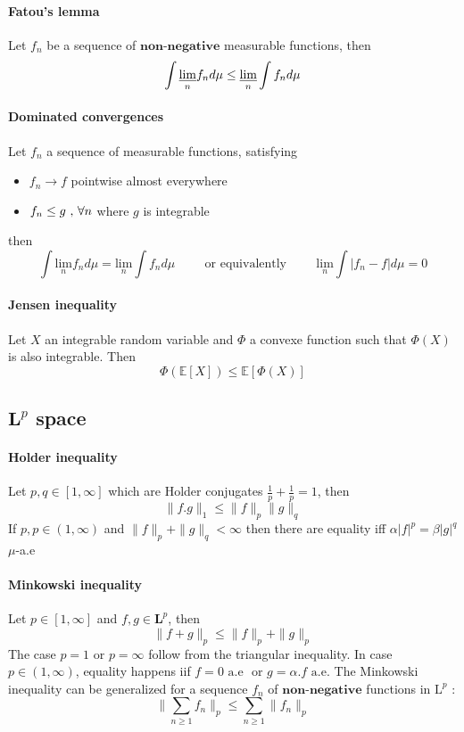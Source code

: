 \documentclass[a4paper,10pt]{article}
\begin{document}
\paragraph{Fatou's lemma}
Let $f_n$ be a sequence of $\textbf{non-negative}$ measurable functions, then
\[
\int \underset{n}{\varliminf} f_n d\mu \leq \underset{n}{\varliminf} \int  f_n d\mu 
\]

\paragraph{Dominated convergences}
Let $f_n$ a sequence of measurable functions, satisfying 
\begin{itemize}
 \item $f_n \longrightarrow f $ pointwise almost everywhere
 \item $f_n \leq g \hbox{ , } \forall n$ where $g$ is integrable 
\end{itemize}
then
\[
\int \underset{n}{\text{lim}} f_n d\mu = \underset{n}{\text{lim}} \int  f_n d\mu 
\hspace{1cm}
\text{or equivalently}
\hspace{1cm}
 \underset{n}{\text{lim}} \int |f_n -f| d\mu =0
\]

\paragraph{Jensen inequality} Let $X$ an integrable random variable and $\varPhi$ a convexe function such that $\varPhi(X)$ is also integrable. Then 
\[
\varPhi(\mathbb{E}[X]) \leq \mathbb{E}[\varPhi(X)]
\]

\subsection{\texorpdfstring{$\textbf{L}^p$}{LpSpace} space}
\paragraph{Holder inequality} Let $p,q \in [1,\infty]$ which are Holder conjugates $\frac{1}{p} + \frac{1}{p} = 1$, then
\[
\| f.g \|_{1} \leq \| f \|_{p}  \| g \|_{q}  
\]
If $p,p \in (1,\infty)$ and $ \| f \|_{p} + \| g \|_{q} <  \infty$ then there are equality iff $\alpha |f|^p = \beta |g|^q$ $\mu$-a.e

\paragraph{Minkowski inequality} Let $p \in [1,\infty]$ and $f,g \in \textbf{L}^p$, then
\[
\| f+g \|_p \leq \| f \|_p  + \| g \|_p 
\]
The case $p=1 \text{ or } p=\infty $ follow from the triangular inequality. In case  $p \in (1,\infty)$, equality happens iif $f=0 \text{ a.e }$ or $ g= \alpha.f \text{ a.e}$. The Minkowski inequality can be generalized for a sequence $f_{n}$ of $\textbf{non-negative}$ functions in $\text{L}^p$ :
\[
\| \sum_{n \geq 1} f_n \|_p \leq  \sum_{n \geq 1} \| f_n \|_p
\]
\end{document}
